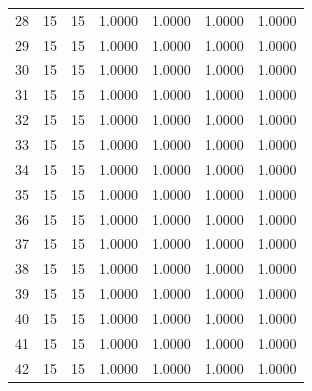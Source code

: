 \begin{tabular}{rrrrrrr}
28 & 15 & 15 & 1.0000 & 1.0000 & 1.0000 & 1.0000 \\
29 & 15 & 15 & 1.0000 & 1.0000 & 1.0000 & 1.0000 \\
30 & 15 & 15 & 1.0000 & 1.0000 & 1.0000 & 1.0000 \\
31 & 15 & 15 & 1.0000 & 1.0000 & 1.0000 & 1.0000 \\
32 & 15 & 15 & 1.0000 & 1.0000 & 1.0000 & 1.0000 \\
33 & 15 & 15 & 1.0000 & 1.0000 & 1.0000 & 1.0000 \\
34 & 15 & 15 & 1.0000 & 1.0000 & 1.0000 & 1.0000 \\
35 & 15 & 15 & 1.0000 & 1.0000 & 1.0000 & 1.0000 \\
36 & 15 & 15 & 1.0000 & 1.0000 & 1.0000 & 1.0000 \\
37 & 15 & 15 & 1.0000 & 1.0000 & 1.0000 & 1.0000 \\
38 & 15 & 15 & 1.0000 & 1.0000 & 1.0000 & 1.0000 \\
39 & 15 & 15 & 1.0000 & 1.0000 & 1.0000 & 1.0000 \\
40 & 15 & 15 & 1.0000 & 1.0000 & 1.0000 & 1.0000 \\
41 & 15 & 15 & 1.0000 & 1.0000 & 1.0000 & 1.0000 \\
42 & 15 & 15 & 1.0000 & 1.0000 & 1.0000 & 1.0000 \\
\bottomrule
\end{tabular}
